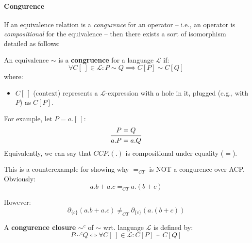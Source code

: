 \documentclass[99-notes-packed.tex]{subfiles}
\begin{document}
\paragraph*{Congurence}
If an equivalence relation is a \textit{congurence} for an operator -- i.e., an operator is \textit{compositional} for the equivalence -- then there exists a sort of isomorphism detailed as follows: 

\begin{definition}[congurence]
    An equivalence $\sim$ is a \textbf{congruence} for a language $\mathcal{L}$ if: 
    \begin{equation*}
        \forall C[\ ] \in \mathcal{L}: P \sim Q \implies C[P] \sim C[Q]
    \end{equation*}
    where: 
    \begin{itemize}
        \item $C[\ ]$ (context) represents a $\mathcal{L}$-expression with a hole in it, plugged (e.g., with $P$) as $C[P]$. 
    \end{itemize}
    
    For example, let $P = a.[\ ]$: 
    \begin{equation*}
        \begin{prooftree}
            \hypo{P = Q}
            \infer1{a.P = a.Q}
        \end{prooftree}
    \end{equation*}
    Equivalently, we can say that $CCP.(.)$ is compositional under equality ($=$). 
\end{definition}

\begin{example}[$=_{CT}$ and $\partial_{H}$]
    This is a counterexample for showing why $=_{CT}$ is NOT a congurence over ACP. Obviously: 
    \begin{equation*}
        a.b + a.c =_{CT} a.(b + c)
    \end{equation*}

    However: 
    \begin{equation*}
        \partial_{\{c\}}(a.b + a.c) \neq_{CT} \partial_{\{c\}}(a.(b + c))
    \end{equation*}
\end{example}

\begin{definition}
    A \textbf{congurence closure} $\sim^c$ of $\sim$ wrt. language $\mathcal{L}$ is defined by: 
    \begin{equation*}
        P \sim^{c} Q \iff \forall C[\ ] \in \mathcal{L}: C[P] \sim C[Q]
    \end{equation*}
\end{definition}
\end{document}
